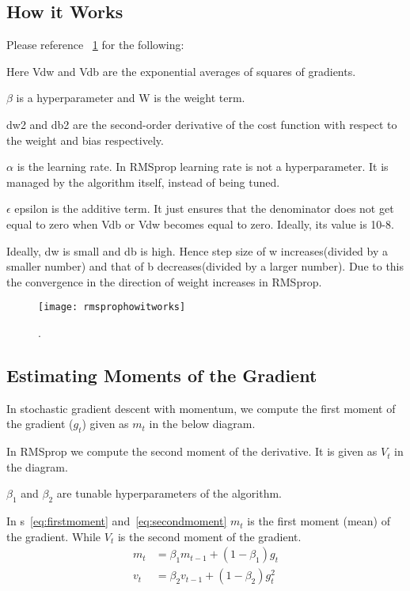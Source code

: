 	\subsection{How it Works}
Please reference \figurename~\ref{fig:rmsprophowitworks} for the following:
	\begin{bulletedlist}
		\item Here Vdw and Vdb are the exponential averages of squares of gradients.
		\item $\beta$ is a hyperparameter and W is the weight term.
		\item dw2 and db2 are the second-order derivative of the cost function with respect to the weight and bias respectively.
		\item $\alpha$ is the learning rate. In RMSprop learning rate is not a hyperparameter.  It is managed by the algorithm itself, instead of being tuned.
		\item $\epsilon$ epsilon is the additive term.  It just ensures that the denominator does not get equal to zero when Vdb or Vdw becomes equal to zero.  Ideally, its value is 10-8.
		\item Ideally, dw is small and db is high. Hence step size of w increases(divided by a smaller number) and that of b decreases(divided by a larger number).  Due to this the convergence in the direction of weight increases in RMSprop.
	\end{bulletedlist}
 	\begin{figure}[h]
		\centering
		\texttt{[image: rmsprophowitworks]}
		\caption{.}
		\label{fig:rmsprophowitworks}
	\end{figure}

	\subsection{Estimating Moments of the Gradient}

	\begin{bulletedlist}
		\item In stochastic gradient descent with momentum, we compute the first moment of the gradient ($g_t$) given as $m_t$ in the below diagram.
		\item In RMSprop we compute the second moment of the derivative. It is given as $V_t$ in the diagram.
		\item $\beta_1$ and $\beta_2$ are tunable hyperparameters of the algorithm.
	\end{bulletedlist}

In \equationname{}s~\ref{eq:firstmoment} and~\ref{eq:secondmoment} $m_t$ is the first moment (mean) of the gradient.  While $V_t$ is the second moment of the gradient.
	\begin{align}
		m_t &= \beta_1 m_{t-1} + \left( 1-\beta_1 \right) g_t   \label{eq:firstmoment} \\
		v_t &= \beta_2 v_{t-1} + \left( 1-\beta_2 \right) g_t^2 \label{eq:secondmoment}
	\end{align}

